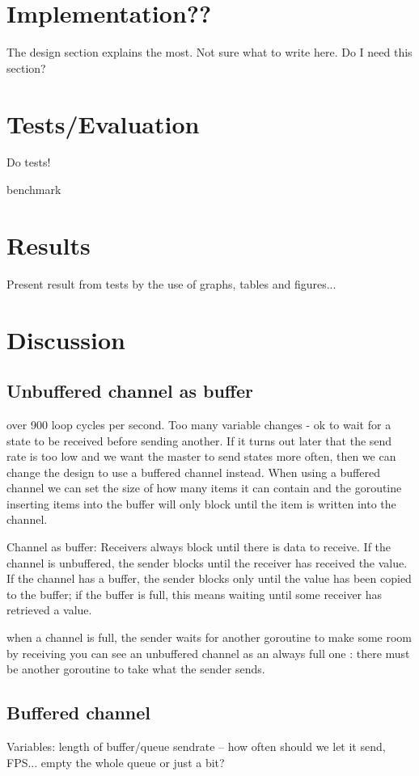\documentclass[12pt, a4paper, oneside]{article}
\begin{document}
\section{Implementation??}
The design section explains the most. Not sure what to write here. Do I need this section?
\section{Tests/Evaluation}
Do tests!

benchmark


\section{Results}
Present result from tests by the use of graphs, tables and figures...
\newpage
\section{Discussion}
\subsection{Unbuffered channel as buffer}
over 900 loop cycles per second. Too many variable changes - ok to wait for a state to be received before sending another. If it turns out later that the send rate is too low and we want the master to send states more often, then we can change the design to use a buffered channel instead. When using a buffered channel we can set the size of how many items it can contain and the goroutine inserting items into the buffer will only block until the item is written into the channel. 

Channel as buffer:
Receivers always block until there is data to receive. If the channel is unbuffered, the sender blocks until the receiver has received the value. If the channel has a buffer, the sender blocks only until the value has been copied to the buffer; if the buffer is full, this means waiting until some receiver has retrieved a value.

when a channel is full, the sender waits for another goroutine to make some room by receiving
you can see an unbuffered channel as an always full one : there must be another goroutine to take what the sender sends.

\subsection{Buffered channel}
Variables:
length of buffer/queue
sendrate – how often should we let it send, FPS...
empty the whole queue or just a bit?
\end{document}

